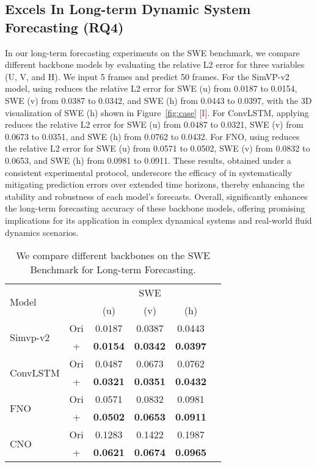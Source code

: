\subsection{\method{} Excels In Long-term Dynamic System Forecasting (RQ4)}   
\label{sec:long}
In our long-term forecasting experiments on the SWE benchmark, we compare different backbone models by evaluating the relative L2 error for three variables (U, V, and H). We input 5 frames and predict 50 frames. For the SimVP-v2 model, using \method{} reduces the relative L2 error for SWE (u) from 0.0187 to 0.0154, SWE (v) from 0.0387 to 0.0342, and SWE (h) from 0.0443 to 0.0397, with the 3D visualization of SWE (h) shown in Figure~\ref{fig:case} [\textcolor{red}{I}]. For ConvLSTM, applying \method{} reduces the relative L2 error for SWE (u) from 0.0487 to 0.0321, SWE (v) from 0.0673 to 0.0351, and SWE (h) from 0.0762 to 0.0432. For FNO, using \method{} reduces the relative L2 error for SWE (u) from 0.0571 to 0.0502, SWE (v) from 0.0832 to 0.0653, and SWE (h) from 0.0981 to 0.0911. These results, obtained under a consistent experimental protocol, underscore the efficacy of \method{} in systematically mitigating prediction errors over extended time horizons, thereby enhancing the stability and robustness of each model's forecasts. Overall, \method{} significantly enhances the long-term forecasting accuracy of these backbone models, offering promising implications for its application in complex dynamical systems and real-world fluid dynamics scenarios.
\begin{table}[t]
  \centering
   \small
  \begin{sc}
    \caption{We compare different backbones on the SWE Benchmark for Long-term Forecasting.}
    \label{tab:time}
    \small
      \begin{tabular}{lccccc}
        \toprule
        \multirow{2}{*}{Model} & \multirow{2}{*}{} & \multicolumn{3}{c}{SWE} \\ 
        \cmidrule(lr){3-5}
        & & (u) & (v) & (h) \\ 
        \midrule
        \multirow{2}{*}{Simvp-v2} & Ori & 0.0187 & 0.0387 & 0.0443 \\
        & +\method{} & \textbf{0.0154} & \textbf{0.0342} & \textbf{0.0397} \\ 
        \midrule
        \multirow{2}{*}{ConvLSTM} & Ori & 0.0487 & 0.0673 & 0.0762 \\
        & +\method{} & \textbf{0.0321} & \textbf{0.0351} & \textbf{0.0432} \\ 
        \midrule
        \multirow{2}{*}{FNO} & Ori & 0.0571 & 0.0832 & 0.0981 \\
        & +\method{} & \textbf{0.0502} & \textbf{0.0653} & \textbf{0.0911} \\ 
        \midrule
        \multirow{2}{*}{CNO} & Ori & 0.1283 & 0.1422 & 0.1987 \\
        & +\method{} & \textbf{0.0621} & \textbf{0.0674} & \textbf{0.0965} \\ 
        \bottomrule
      \end{tabular}%
  \end{sc}
\end{table}

